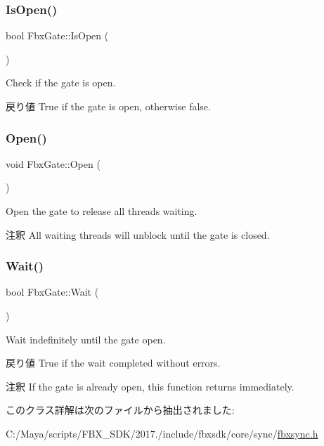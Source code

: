 \subsubsection{\texorpdfstring{Is\+Open()}{IsOpen()}}
{\footnotesize\ttfamily bool Fbx\+Gate\+::\+Is\+Open (\begin{DoxyParamCaption}{ }\end{DoxyParamCaption})}

Check if the gate is open. \begin{DoxyReturn}{戻り値}
True if the gate is open, otherwise false. 
\end{DoxyReturn}
\mbox{\label{class_fbx_gate_acd9a45eb0ef7d06f2a4a7f5954555310}} 
\subsubsection{\texorpdfstring{Open()}{Open()}}
{\footnotesize\ttfamily void Fbx\+Gate\+::\+Open (\begin{DoxyParamCaption}{ }\end{DoxyParamCaption})}

Open the gate to release all threads waiting. \begin{DoxyRemark}{注釈}
All waiting threads will unblock until the gate is closed. 
\end{DoxyRemark}
\mbox{\label{class_fbx_gate_ad3d9e530f43a6f446c2d09364153c918}} 
\subsubsection{\texorpdfstring{Wait()}{Wait()}}
{\footnotesize\ttfamily bool Fbx\+Gate\+::\+Wait (\begin{DoxyParamCaption}{ }\end{DoxyParamCaption})}

Wait indefinitely until the gate open. \begin{DoxyReturn}{戻り値}
True if the wait completed without errors. 
\end{DoxyReturn}
\begin{DoxyRemark}{注釈}
If the gate is already open, this function returns immediately. 
\end{DoxyRemark}


このクラス詳解は次のファイルから抽出されました\+:\begin{DoxyCompactItemize}
\item 
C\+:/\+Maya/scripts/\+F\+B\+X\+\_\+\+S\+D\+K/2017./include/fbxsdk/core/sync/\hyperlink{fbxsync_8h}{fbxsync.\+h}\end{DoxyCompactItemize}
